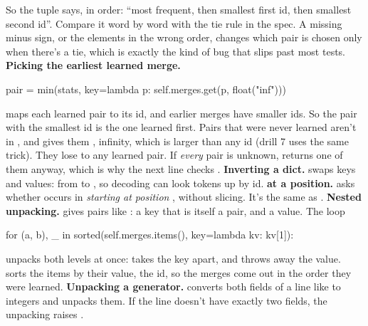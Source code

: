 \documentclass[10pt,a4paper]{article}
\begin{document}
So the tuple says, in order: “most frequent, then smallest first id, then smallest second id”. Compare it word by word with the tie rule in the spec. A missing minus sign, or the elements in the wrong order, changes which pair is chosen only when there’s a tie, which is exactly the kind of bug that slips past most tests.
\textbf{Picking the earliest learned merge.}
\begin{pycode}
pair = min(stats, key=lambda p: self.merges.get(p, float("inf")))
\end{pycode}
 maps each learned pair to its id, and earlier merges have smaller ids. So the pair with the smallest id is the one learned first. Pairs that were never learned aren’t in , and  gives them , infinity, which is larger than any id (drill 7 uses the same trick). They lose to any learned pair. If \emph{every} pair is unknown,  returns one of them anyway, which is why the next line checks .
\textbf{Inverting a dict.}  swaps keys and values: from  to , so decoding can look tokens up by id.
\textbf{ at a position.}  asks whether  occurs in  \emph{starting at position }, without slicing. It’s the same as .
\textbf{Nested unpacking.}  gives pairs like : a key that is itself a pair, and a value. The loop
\begin{pycode}
for (a, b), _ in sorted(self.merges.items(), key=lambda kv: kv[1]):
\end{pycode}
unpacks both levels at once:  takes the key apart, and \code{\_} throws away the value.  sorts the items by their value, the id, so the merges come out in the order they were learned.
\textbf{Unpacking a generator.}  converts both fields of a line like  to integers and unpacks them. If the line doesn’t have exactly two fields, the unpacking raises .
\end{document}
